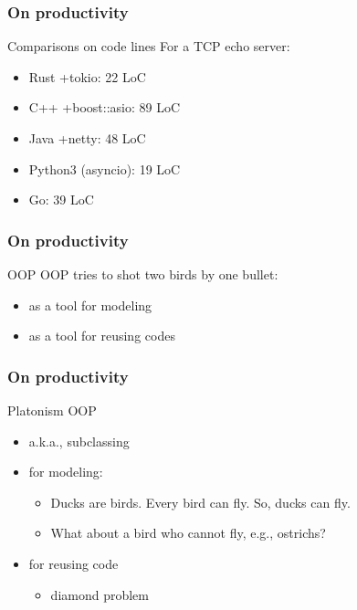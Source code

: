 \documentclass[lualatex,utf8]{beamer}
\begin{document}
\begin{frame}
  \frametitle{On productivity}
  \begin{block}{Comparisons on code lines}
    For a TCP echo server:
    \begin{itemize}
    \item Rust +tokio: 22 LoC
    \item C++ +boost::asio: 89 LoC
    \item Java +netty: 48 LoC
    \item Python3 (asyncio): 19 LoC
    \item Go: 39 LoC
    \end{itemize}
  \end{block}
\end{frame}

\begin{frame}
  \frametitle{On productivity}
  \begin{block}{OOP}
    OOP tries to shot two birds by one bullet:
    \begin{itemize}
    \item as a tool for modeling
    \item as a tool for reusing codes
    \end{itemize}
  \end{block}
\end{frame}

\begin{frame}
  \frametitle{On productivity}
  \begin{block}{Platonism OOP}
    \begin{itemize}
    \item a.k.a., subclassing
    \item for modeling:
      \begin{itemize}
      \item Ducks are birds. Every bird can fly. So, ducks can fly.
      \item What about a bird who cannot fly, e.g., ostrichs?
      \end{itemize}
    \item for reusing code
      \begin{itemize}
      \item diamond problem
      \end{itemize}
    \end{itemize}
  \end{block}
\end{frame}
\end{document}
